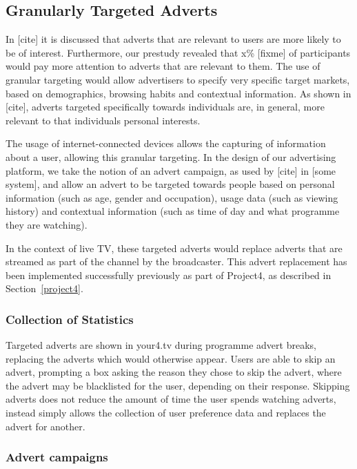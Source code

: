 \subsection{Granularly Targeted Adverts}
\label{sec:design_adverts}

In [cite] it is discussed that adverts that are relevant to users are more likely to be of interest. Furthermore, our prestudy revealed that x\% [fixme] of participants would pay more attention to adverts that are relevant to them. The use of granular targeting would allow advertisers to specify very specific target markets, based on demographics, browsing habits and contextual information. As shown in [cite], adverts targeted specifically towards individuals are, in general, more relevant to that individuals personal interests.

The usage of internet-connected devices allows the capturing of information about a user, allowing this granular targeting. In the design of our advertising platform, we take the notion of an advert campaign, as used by [cite] in [some system], and allow an advert to be targeted towards people based on personal information (such as age, gender and occupation), usage data (such as viewing history) and contextual information (such as time of day and what programme they are watching).

In the context of live TV, these targeted adverts would replace adverts that are streamed as part of the channel by the broadcaster. This advert replacement has been implemented successfully previously as part of Project4, as described in Section~\ref{project4}.

\subsubsection{Collection of Statistics}

Targeted adverts are shown in your4.tv during programme advert breaks, replacing the adverts which would otherwise appear. Users are able to skip an advert, prompting a box asking the reason they chose to skip the advert, where the advert may be blacklisted for the user, depending on their response. Skipping adverts does not reduce the amount of time the user spends watching adverts, instead simply allows the collection of user preference data and replaces the advert for another.

\subsubsection{Advert campaigns}

